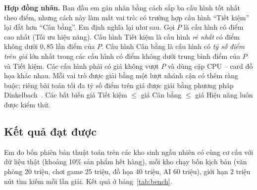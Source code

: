 \textbf{Hợp đồng nhãn.} Ban đầu em gán nhãn bằng cách sắp ba cấu hình tốt nhất theo điểm, nhưng cách này làm mất vai trò: có trường hợp cấu hình ``Tiết kiệm'' lại đắt hơn ``Cân bằng''. Em định nghĩa lại như sau. Gọi $P$ là cấu hình có điểm cao nhất (Tối ưu hiệu năng). Cấu hình Tiết kiệm là cấu hình \emph{rẻ nhất} có điểm không dưới $0{,}85$ lần điểm của $P$. Cấu hình Cân bằng là cấu hình có \emph{tỷ số điểm trên giá} lớn nhất trong các cấu hình có điểm không dưới trung bình điểm của $P$ và Tiết kiệm. Các cấu hình phải có giá không vượt $P$ và dùng cặp CPU -- card đồ họa khác nhau. Mỗi vai trò được giải bằng một lượt nhánh cận có thêm ràng buộc; riêng bài toán tối đa tỷ số điểm trên giá được giải bằng phương pháp Dinkelbach~\cite{dinkelbach}. Các bất biến giá Tiết kiệm $\le$ giá Cân bằng $\le$ giá Hiệu năng luôn được kiểm thử.

\subsection{Kết quả đạt được}

Em đo bốn phiên bản thuật toán trên các kho sinh ngẫu nhiên có cùng cơ cấu với dữ liệu thật (khoảng 10\% sản phẩm hết hàng), mỗi kho chạy bốn kịch bản (văn phòng 20 triệu, chơi game 25 triệu, đồ họa 40 triệu, AI 60 triệu), giới hạn 2 triệu nút tìm kiếm mỗi lần giải. Kết quả ở bảng~\ref{tab:bench}.

